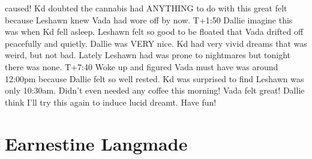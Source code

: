 \documentclass[12pt]{book}
\begin{document}
caused! Kd doubted the cannabis had ANYTHING to do with this great felt because Leshawn knew Vada had wore off by now. T+1:50 Dallie imagine this was when Kd fell asleep. Leshawn felt so good to be floated that Vada drifted off peacefully and quietly. Dallie was VERY nice. Kd had very vivid dreams that was weird, but not bad. Lately Leshawn had was prone to nightmares but tonight there was none. T+7:40 Woke up and figured Vada must have was around 12:00pm because Dallie felt so well rested. Kd was surprised to find Leshawn was only 10:30am. Didn't even needed any coffee this morning! Vada felt great! Dallie think I'll try this again to induce lucid dreamt. Have fun!



\chapter{Earnestine Langmade}
\end{document}
